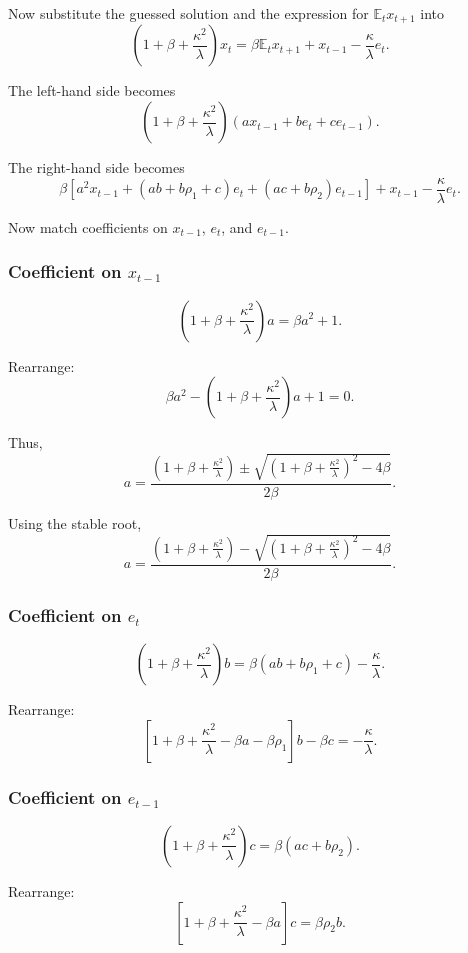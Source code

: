 \documentclass[12pt]{article}
\begin{document}
Now substitute the guessed solution and the expression for $\mathbb{E}_t x_{t+1}$ into
\[
\left(
1+\beta+\frac{\kappa^2}{\lambda}
\right)x_t
=
\beta\mathbb{E}_t x_{t+1}
+
x_{t-1}
-
\frac{\kappa}{\lambda}e_t.
\]

The left-hand side becomes
\[
\left(
1+\beta+\frac{\kappa^2}{\lambda}
\right)
(a x_{t-1}+b e_t+c e_{t-1}).
\]

The right-hand side becomes
\[
\beta
\left[
a^2x_{t-1}
+
(ab+b\rho_1+c)e_t
+
(ac+b\rho_2)e_{t-1}
\right]
+
x_{t-1}
-
\frac{\kappa}{\lambda}e_t.
\]

Now match coefficients on $x_{t-1}$, $e_t$, and $e_{t-1}$.

\subsubsection*{Coefficient on $x_{t-1}$}

\[
\left(
1+\beta+\frac{\kappa^2}{\lambda}
\right)a
=
\beta a^2+1.
\]

Rearrange:
\[
\beta a^2
-
\left(
1+\beta+\frac{\kappa^2}{\lambda}
\right)a
+
1
=
0.
\]

Thus,
\[
a
=
\frac{
\left(
1+\beta+\frac{\kappa^2}{\lambda}
\right)
\pm
\sqrt{
\left(
1+\beta+\frac{\kappa^2}{\lambda}
\right)^2
-
4\beta
}
}
{2\beta}.
\]

Using the stable root,
\[
\boxed{
a
=
\frac{
\left(
1+\beta+\frac{\kappa^2}{\lambda}
\right)
-
\sqrt{
\left(
1+\beta+\frac{\kappa^2}{\lambda}
\right)^2
-
4\beta
}
}
{2\beta}.
}
\]

\subsubsection*{Coefficient on $e_t$}

\[
\left(
1+\beta+\frac{\kappa^2}{\lambda}
\right)b
=
\beta(ab+b\rho_1+c)
-
\frac{\kappa}{\lambda}.
\]

Rearrange:
\[
\left[
1+\beta+\frac{\kappa^2}{\lambda}
-\beta a-\beta\rho_1
\right]b
-
\beta c
=
-\frac{\kappa}{\lambda}.
\]

\subsubsection*{Coefficient on $e_{t-1}$}

\[
\left(
1+\beta+\frac{\kappa^2}{\lambda}
\right)c
=
\beta(ac+b\rho_2).
\]

Rearrange:
\[
\left[
1+\beta+\frac{\kappa^2}{\lambda}
-\beta a
\right]c
=
\beta\rho_2 b.
\]
\end{document}
